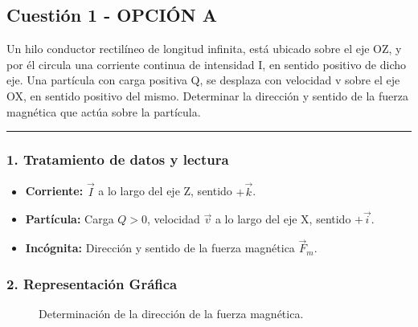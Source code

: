 \subsection{Cuestión 1 - OPCIÓN A}
\label{subsec:4A_2001_jun_ord}

\begin{cajaenunciado}
Un hilo conductor rectilíneo de longitud infinita, está ubicado sobre el eje OZ, y por él circula una corriente continua de intensidad I, en sentido positivo de dicho eje. Una partícula con carga positiva Q, se desplaza con velocidad v sobre el eje OX, en sentido positivo del mismo. Determinar la dirección y sentido de la fuerza magnética que actúa sobre la partícula.
\end{cajaenunciado}
\hrule

\subsubsection*{1. Tratamiento de datos y lectura}
\begin{itemize}
    \item \textbf{Corriente:} $\vec{I}$ a lo largo del eje Z, sentido $+\vec{k}$.
    \item \textbf{Partícula:} Carga $Q>0$, velocidad $\vec{v}$ a lo largo del eje X, sentido $+\vec{i}$.
    \item \textbf{Incógnita:} Dirección y sentido de la fuerza magnética $\vec{F}_m$.
\end{itemize}

\subsubsection*{2. Representación Gráfica}
\begin{figure}[H]
    \centering
    \caption{Determinación de la dirección de la fuerza magnética.}
\end{figure}

